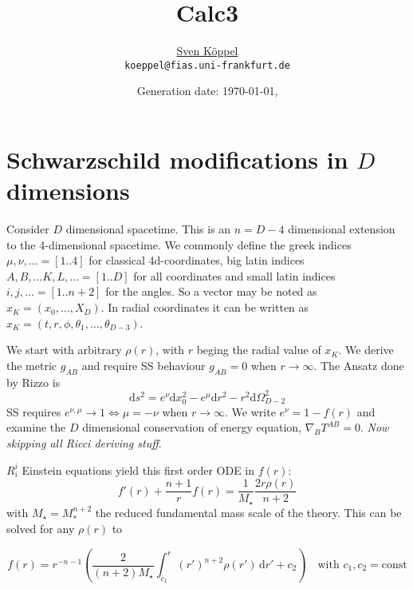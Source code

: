 \documentclass[10pt,a4paper, fleqn]{article}
\title{\vspace{-9ex} Calc3 \vspace{-1ex}} %
\author{\small %
\href{https://itp.uni-frankfurt.de/~koeppel}{Sven Köppel} \\
\small \texttt{koeppel@fias.uni-frankfurt.de}}
\date{\small Generation date: \today, \currenttime}
\begin{document}
\maketitle

\renewcommand{\d}{\mathrm{d}}
\newcommand{\dd}[2]{\frac{\mathrm{d} #1}{\mathrm{d} #2}}
\renewcommand{\L}{L_P}
\newcommand{\pr}{p_r}
\newcommand{\psenk}{p_\perp}
\newcommand{\ebenso}{\biggl( ~ \therefore ~ \biggr) }
\newcommand{\metrik}[1]{\d s^2 = \left( #1 \right) \d t^2 \left( #1 \right)^{-1} \d r^2 + r^2 \d \Omega^2 }
\newcommand{\winkel}{r^2 \d \Omega^2}
\newcommand{\dann}{$\rightarrow~$}

\section{Schwarzschild modifications in $D$ dimensions}

Consider $D$ dimensional spacetime. This is an $n=D-4$ dimensional extension to the 4-dimensional spacetime. We commonly define the greek indices $\mu,\nu,\dots=[1..4]$ for classical 4d-coordinates, big latin indices $A,B,\dots K,L,\dots=[1..D]$ for all coordinates and small latin indices $i,j,\dots=[1..n+2]$ for the angles. So a vector may be noted as $x_K = (x_0, \dots, X_D)$. In radial coordinates it can be written as $x_K = (t, r, \phi, \theta_1, \dots, \theta_{D-3})$. 

We start with arbitrary $\rho(r)$, with $r$ beging the radial value of $x_K$. We derive the metric $g_{AB}$ and require SS behaviour $g_{AB}=0$  when $r\to \infty$. The Ansatz done by Rizzo is
%
\begin{equation}
\d s^2 = e^\nu \d x_0^2 - e^\mu \d r^2 - r^2 \d \Omega^2_{D-2}
\end{equation}
%
SS requires $e^{\nu,\mu} \to 1 \Leftrightarrow \mu=-\nu$ when $r\to\infty$. We write $e^\nu = 1 - f(r)$ and examine the $D$ dimensional conservation of energy equation, $\nabla_B  T^{AB} = 0$. {\it Now skipping all Ricci deriving stuff}.

$R^i_i$ Einstein equations yield this first order ODE in $f(r)$:
\begin{equation}
f'(r) + \frac{n+1}{r} f(r) = \frac{1}{M_\star} \frac{2r\rho(r)}{n+2}
\end{equation}
with $M_\star = M_*^{n+2}$ the reduced fundamental mass scale of the theory. This can be solved for any $\rho(r)$ to

\begin{equation}
f(r) = r^{-n-1} \left(\frac{2}{(n+2)M_\star}\int_{c_1}^r (r')^{n+2} \rho (r') \, \d r' + c_2 \right) \quad\text{with } c_1, c_2 =\text{const}  \label{general-sol}
\end{equation}
\end{document}
